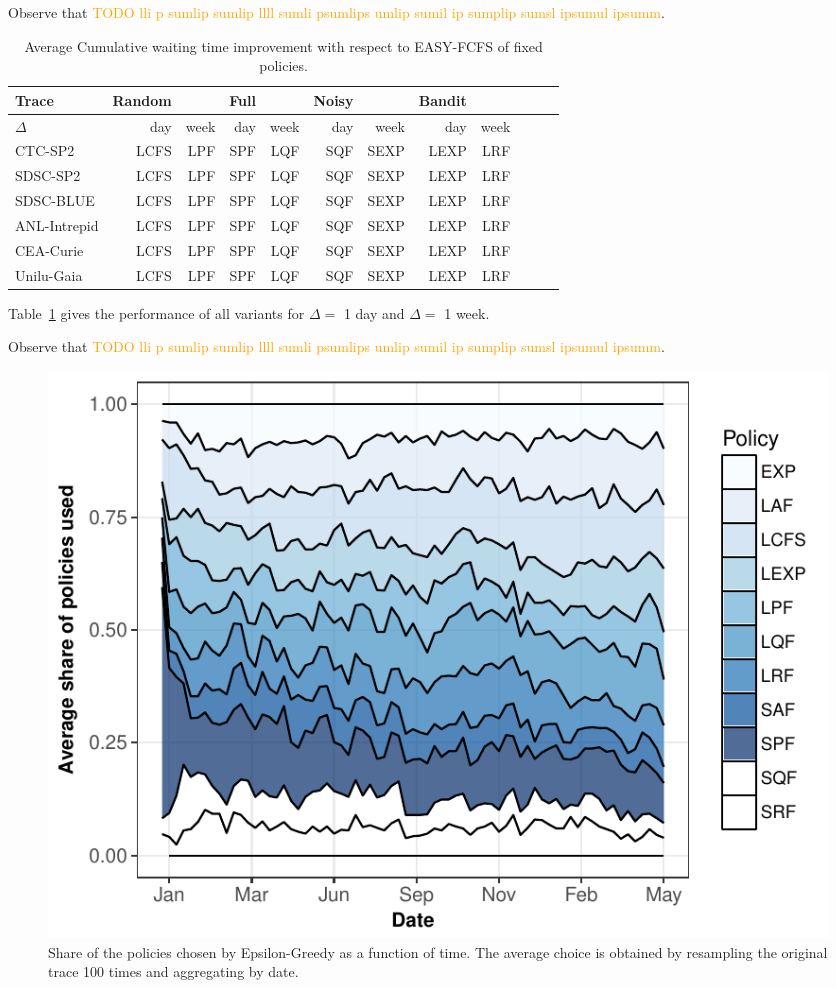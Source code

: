 \documentclass[sigconf,review,anonymous]{acmart}
\newcommand{\ra}[1]{\renewcommand{\arraystretch}{#1}}
\begin{document}
Observe that \textcolor{orange}{TODO lli  p sumlip sumlip llll sumli psumlips umlip sumil ip sumplip sumsl  ipsumul   ipsumm}.

\begin{table}[]
  \centering
  \ra{1.3}
  \caption{Average Cumulative waiting time improvement with respect to EASY-FCFS of fixed policies.}
  \label{tab:strat}
  \begin{tabular}{@{}lrrrrrrrrrrr@{}}
    \hline
    Trace        & Random &      & Full &      & Noisy &      & Bandit &     \\
    \hline
    $\Delta$     & day    & week & day  & week & day   & week & day    & week\\
    CTC-SP2      & LCFS   & LPF  & SPF  & LQF  & SQF   & SEXP & LEXP   & LRF \\
    SDSC-SP2     & LCFS   & LPF  & SPF  & LQF  & SQF   & SEXP & LEXP   & LRF \\
    SDSC-BLUE    & LCFS   & LPF  & SPF  & LQF  & SQF   & SEXP & LEXP   & LRF \\
    ANL-Intrepid & LCFS   & LPF  & SPF  & LQF  & SQF   & SEXP & LEXP   & LRF \\
    CEA-Curie    & LCFS   & LPF  & SPF  & LQF  & SQF   & SEXP & LEXP   & LRF \\
    Unilu-Gaia   & LCFS   & LPF  & SPF  & LQF  & SQF   & SEXP & LEXP   & LRF \\
    \hline
  \end{tabular}
\end{table}

Table~\ref{tab:strat} gives the performance of all variants for $\Delta=$ 1
day and $\Delta=$ 1 week.

Observe that \textcolor{orange}{TODO lli  p sumlip sumlip llll sumli psumlips umlip sumil ip sumplip sumsl  ipsumul   ipsumm}.

\begin{figure}[]
  \centering
  \includegraphics[scale=0.6]{figures/mosaicbandit-UniLu-Ga.pdf}

  \caption{Share of the policies chosen by Epsilon-Greedy as a function of
  time. The average choice is obtained by resampling the original trace 100
times and aggregating by date.}

  \label{fig:mosb}
\end{figure}
\end{document}
